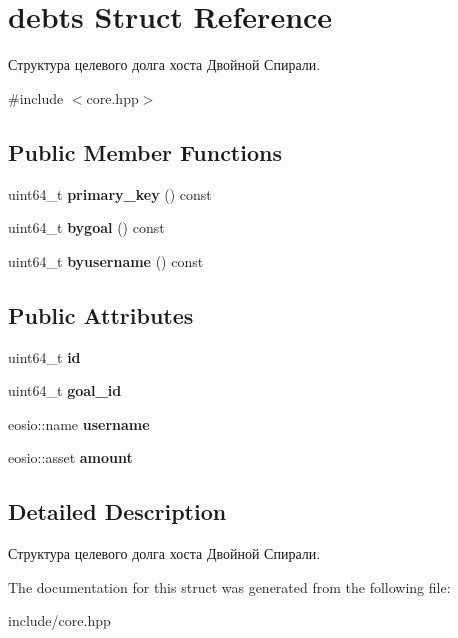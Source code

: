 \hypertarget{structdebts}{}\section{debts Struct Reference}
\label{structdebts}


Структура целевого долга хоста Двойной Спирали.  




{\ttfamily \#include $<$core.\+hpp$>$}

\subsection*{Public Member Functions}
\begin{DoxyCompactItemize}
\item 
\mbox{\label{structdebts_adc67177f964ad4b62951d18b6fb02344}} 
uint64\+\_\+t {\bfseries primary\+\_\+key} () const
\item 
\mbox{\label{structdebts_ad47725f71d772fe4a492b2dcb1b9eec7}} 
uint64\+\_\+t {\bfseries bygoal} () const
\item 
\mbox{\label{structdebts_a55268520b4adab0ca4058af1da834fb6}} 
uint64\+\_\+t {\bfseries byusername} () const
\end{DoxyCompactItemize}
\subsection*{Public Attributes}
\begin{DoxyCompactItemize}
\item 
\mbox{\label{structdebts_a6b66af46bb77f8d69f348666b7101c76}} 
uint64\+\_\+t {\bfseries id}
\item 
\mbox{\label{structdebts_a0c81af97bc2a68cc5b9f69cc1764cae9}} 
uint64\+\_\+t {\bfseries goal\+\_\+id}
\item 
\mbox{\label{structdebts_aca867fc824e45f7e0bb7917f22166cc2}} 
eosio\+::name {\bfseries username}
\item 
\mbox{\label{structdebts_a22ed3e73b254ae3781eee307713c4d23}} 
eosio\+::asset {\bfseries amount}
\end{DoxyCompactItemize}


\subsection{Detailed Description}
Структура целевого долга хоста Двойной Спирали. 

The documentation for this struct was generated from the following file\+:\begin{DoxyCompactItemize}
\item 
include/core.\+hpp\end{DoxyCompactItemize}
